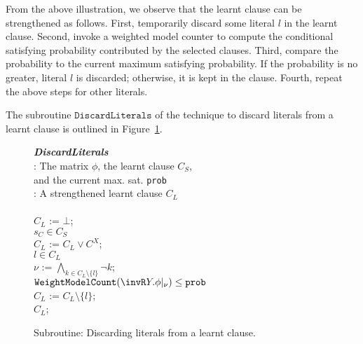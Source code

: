 From the above illustration,
we observe that the learnt clause can be strengthened as follows.
First, temporarily discard some literal $l$ in the learnt clause.
Second, invoke a weighted model counter to compute the conditional satisfying probability contributed by the selected clauses.
Third, compare the probability to the current maximum satisfying probability.
If the probability is no greater, literal $l$ is discarded; otherwise, it is kept in the clause.
Fourth, repeat the above steps for other literals.

\iffalse
    The subroutine $\mathtt{DiscardLiterals}$ of the technique to discard literals from a learnt clause is outlined in Figure~\ref{fig:partial}.
    \begin{figure}[h]
        \mbox{}\hrulefill \vspace{-.6em}
        \small
        \begin{program}
            \>  {\bf \textit{DiscardLiterals}}\\
            \> \> \INPUT: The matrix $\phi$, the learnt clause $C_S$,\\
            \> \> \> \> \> and the current max. sat. \texttt{prob}\\
            \> \> \OUTPUT: A strengthened learnt clause $C_L$\\
            \> \> \BEGIN\\
            \>  \> \> $C_L$ := $\bot$;\\
            \>  \> \> \FOREACH $s_C \in C_S$\\
            \>  \> \> \> $C_L$ := $C_L \vee C^X$;\\
            \>  \> \> \FOREACH $l \in C_L$\\
            \>  \> \> \> $\nu$ := $\bigwedge_{k \in C_L \setminus \{l\}}\neg k$;\\
            \>  \> \> \> \IF \> $\mathtt{WeightModelCount}(\invR Y.\phi|_{\nu}) \leq \texttt{prob}$\\
            \>  \> \> \> \> $C_L$ := $C_L \setminus \{l\}$;\\
            \>  \> \> \RETURN $C_L$;\\
            \> \> \END
        \end{program}
        \vspace{-1.2em} \mbox{}\hrulefill \caption{\small Subroutine: Discarding literals from a learnt clause.}
        \label{fig:partial}
    \end{figure}


